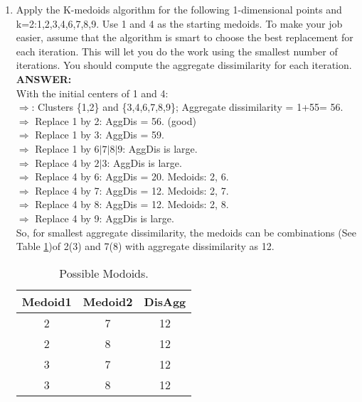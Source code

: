 \documentclass{article}
\begin{document}
\begin{enumerate}
\item Apply the K-medoids algorithm for the following 1-dimensional
  points and k=2:1,2,3,4,6,7,8,9. Use 1 and 4 as the starting medoids.
  To make your job easier, assume that the algorithm is smart to
  choose the best replacement for each iteration. This will let you do
  the work using the smallest number of iterations. You should compute
  the aggregate dissimilarity for each iteration.\\ 
\textbf{ANSWER:} \\
With the initial centers of 1 and 4: \\
$\Rightarrow$: Clusters \{1,2\} and \{3,4,6,7,8,9\}; Aggregate
dissimilarity = 1+55= 56. \\
$\Rightarrow$ Replace 1 by 2: AggDis = 56. (good)\\
$\Rightarrow$ Replace 1 by 3: AggDis = 59. \\
$\Rightarrow$ Replace 1 by $6|7|8|9$: AggDis is large. \\
$\Rightarrow$ Replace 4 by $2|3$: AggDis is large. \\
$\Rightarrow$ Replace 4 by 6: AggDis = 20. Medoids: 2, 6.\\
$\Rightarrow$ Replace 4 by 7: AggDis = 12. Medoids: 2, 7.\\
$\Rightarrow$ Replace 4 by 8: AggDis = 12. Medoids: 2, 8.\\
$\Rightarrow$ Replace 4 by 9: AggDis is large.\\
So, for smallest aggregate dissimilarity, the medoids can be
combinations (See Table \ref{tbl:modoids})of 2(3) and 7(8) with
aggregate dissimilarity as 12. 
\begin{table}[H]
  \begin{center}
    \begin{tabular}{|c|c|c|} 
      \hline Medoid1 & Medoid2 & DisAgg \\
      \hline 2 & 7 & 12 \\
      \hline 2 & 8 & 12 \\
      \hline 3 & 7 & 12 \\
      \hline 3 & 8 & 12 \\
      \hline
    \end{tabular}
    \caption{Possible Modoids. \label{tbl:modoids}} 
    \vspace{-15pt}
  \end{center}
\end{table}


\end{enumerate}
\end{document}
